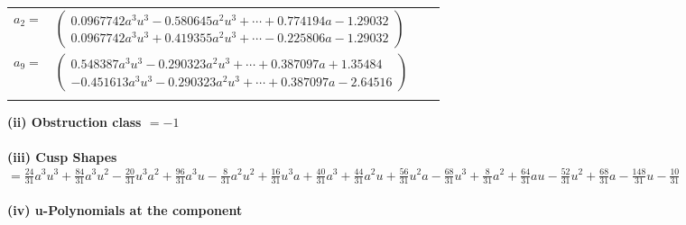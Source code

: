 \documentclass[1p]{elsarticle_modified}
\theoremstyle{definition}
\begin{document}
\begin{tabular}{m{7pt} m{180pt} m{7pt} m{180pt} }
\flushright $a_{2}=$&$\begin{pmatrix}0.0967742 a^{3} u^{3}-0.580645 a^{2} u^{3}+\cdots+0.774194 a-1.29032\\0.0967742 a^{3} u^{3}+0.419355 a^{2} u^{3}+\cdots-0.225806 a-1.29032\end{pmatrix}$ \\
\flushright $a_{9}=$&$\begin{pmatrix}0.548387 a^{3} u^{3}-0.290323 a^{2} u^{3}+\cdots+0.387097 a+1.35484\\-0.451613 a^{3} u^{3}-0.290323 a^{2} u^{3}+\cdots+0.387097 a-2.64516\end{pmatrix}$\\&\end{tabular}
\flushleft \textbf{(ii) Obstruction class $= -1$}\\~\\
\flushleft \textbf{(iii) Cusp Shapes $= \frac{24}{31} a^3 u^3+\frac{84}{31} a^3 u^2-\frac{20}{31} u^3 a^2+\frac{96}{31} a^3 u-\frac{8}{31} a^2 u^2+\frac{16}{31} u^3 a+\frac{40}{31} a^3+\frac{44}{31} a^2 u+\frac{56}{31} u^2 a-\frac{68}{31} u^3+\frac{8}{31} a^2+\frac{64}{31} a u-\frac{52}{31} u^2+\frac{68}{31} a-\frac{148}{31} u-\frac{10}{31}$}\\~\\
\newpage\renewcommand{\arraystretch}{1}
\flushleft \textbf{(iv) u-Polynomials at the component}\newline \\
\end{document}
